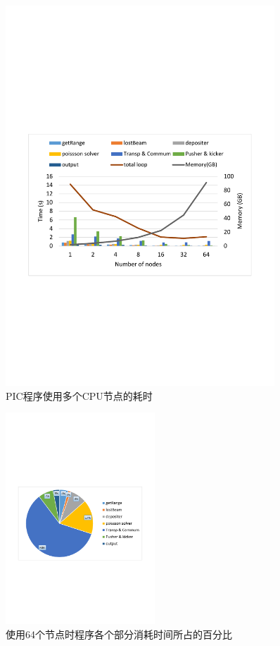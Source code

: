 \begin{figure}[!htb]
  \centering
  \includegraphics[width=0.9\textwidth]{Img/PIC_speedup_Cori_scalability.pdf}
  \caption{PIC程序使用多个CPU节点的耗时}
  \label{fig:PIC_speedup_Cori_scalability}
\end{figure}

\begin{figure}[!htb]
  \centering
  \includegraphics[width=0.5\textwidth]{Img/PIC_speedup_Cori_percetage_64nodes.pdf}
  \caption{使用64个节点时程序各个部分消耗时间所占的百分比}
  \label{fig:PIC_speedup_Cori_percetage_64nodes}
\end{figure}

